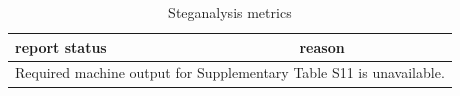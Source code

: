 \begin{table}[htbp]
\centering
\caption{Steganalysis metrics}
\label{tab:s11}
\begin{tabular}{ll}
\hline
report status & reason \\
\hline
\multicolumn{2}{l}{Required machine output for Supplementary Table S11 is unavailable.} \\
\hline
\end{tabular}
\end{table}
